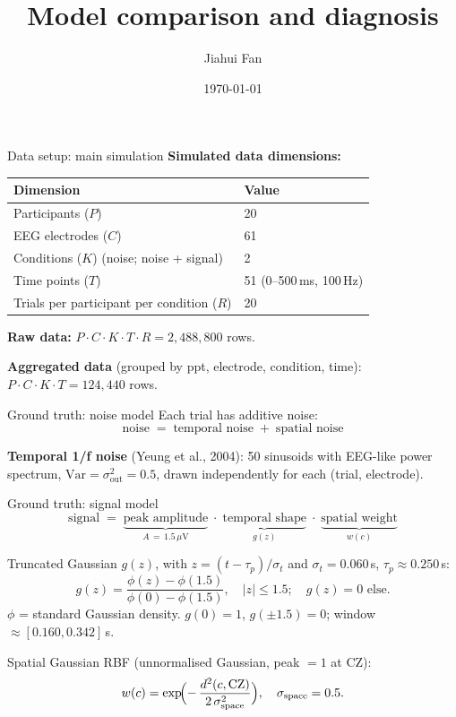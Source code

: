 \documentclass{beamer}
\title{Model comparison and diagnosis}
\author{Jiahui Fan}
\date{\today}
\begin{document}
\frame{\titlepage}

\begin{frame}{Data setup: main simulation}
\small
\textbf{Simulated data dimensions:}
\begin{tabular}{ll}
\toprule
Dimension & Value \\
\midrule
Participants ($P$)                & 20 \\
EEG electrodes ($C$)              & 61 \\
Conditions ($K$) (noise; noise + signal) & 2 \\
Time points ($T$)                 & 51 (0--500\,ms, 100\,Hz) \\
Trials per participant per condition ($R$) & 20 \\
\bottomrule
\end{tabular}

\bigskip
\textbf{Raw data:} $P \cdot C \cdot K \cdot T \cdot R = 2{,}488{,}800$ rows.

\smallskip
\textbf{Aggregated data} (grouped by ppt, electrode, condition, time):
$P \cdot C \cdot K \cdot T = 124{,}440$ rows.
\end{frame}

\begin{frame}{Ground truth: noise model}
\small
Each trial has additive noise:
\[
\text{noise} \;=\; \text{temporal noise} \;+\; \text{spatial noise}
\]

\medskip
\textbf{Temporal 1/f noise} (Yeung et al., 2004): 50 sinusoids
with EEG-like power spectrum,
$\mathrm{Var} = \sigma^{2}_{\text{out}} = 0.5$, drawn independently
for each (trial, electrode).
\end{frame}

\begin{frame}{Ground truth: signal model}
\small
\[
\text{signal}
\;=\;
\underbrace{\text{peak amplitude}}_{A\,=\,1.5\,\mu\mathrm{V}}
\;\cdot\;
\underbrace{\text{temporal shape}}_{g(z)}
\;\cdot\;
\underbrace{\text{spatial weight}}_{w(c)}
\]

\medskip
Truncated Gaussian $g(z)$, with $z = (t - \tau_p)/\sigma_t$ and
$\sigma_t = 0.060$\,s, $\tau_p \approx 0.250$\,s:
\[
g(z) = \frac{\phi(z) - \phi(1.5)}{\phi(0) - \phi(1.5)},
\quad |z| \le 1.5; \quad g(z) = 0 \text{ else.}
\]
$\phi$ = standard Gaussian density. $g(0)=1$, $g(\pm 1.5)=0$;
window $\approx [0.160, 0.342]$\,s.

\medskip
Spatial Gaussian RBF (unnormalised Gaussian, peak $=1$ at CZ):
\[
w(c) = \exp\!\Bigl(-\,\frac{d^{2}(c, \mathrm{CZ})}{2\,\sigma_{\mathrm{space}}^{2}}\Bigr),
\quad \sigma_{\mathrm{space}} = 0.5.
\]

\end{frame}
\end{document}

